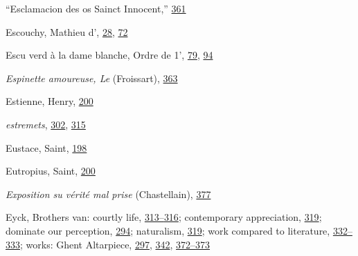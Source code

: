 ``Esclamacion des os Sainct Innocent,''
\protect\hyperlink{21_Chapter_Thirteen__IMAGE_AND_WORD.xhtmlux5cux23page_361}{361}

Escouchy, Mathieu d',
\protect\hyperlink{08_Chapter_One__THE_PASSIONATE_INTE.xhtmlux5cux23page_28}{28},
\protect\hyperlink{10_Chapter_Three__THE_HEROIC_DREAM.xhtmlux5cux23page_72}{72}

\protect\hypertarget{25_INDEX.xhtmlux5cux23page_457}{}{}Escu verd à la
dame blanche, Ordre de 1',
\protect\hyperlink{10_Chapter_Three__THE_HEROIC_DREAM.xhtmlux5cux23page_79}{79},
\protect\hyperlink{10_Chapter_Three__THE_HEROIC_DREAM.xhtmlux5cux23page_94}{94}

\emph{Espinette amoureuse, Le} (Froissart),
\protect\hyperlink{21_Chapter_Thirteen__IMAGE_AND_WORD.xhtmlux5cux23page_363}{363}

Estienne, Henry,
\protect\hyperlink{13_Chapter_Six__THE_DEPICTION_OF_TH.xhtmlux5cux23page_200}{200}

\emph{estremets},
\protect\hyperlink{20_ILLUSTRATIONS_FOLLOW_PAGE.xhtmlux5cux23page_302}{302},
\protect\hyperlink{20_ILLUSTRATIONS_FOLLOW_PAGE.xhtmlux5cux23page_315}{315}

Eustace, Saint,
\protect\hyperlink{13_Chapter_Six__THE_DEPICTION_OF_TH.xhtmlux5cux23page_198}{198}

Eutropius, Saint,
\protect\hyperlink{13_Chapter_Six__THE_DEPICTION_OF_TH.xhtmlux5cux23page_200}{200}

\emph{Exposition su vérité mal prise} (Chastellain),
\protect\hyperlink{21_Chapter_Thirteen__IMAGE_AND_WORD.xhtmlux5cux23page_377}{377}

Eyck, Brothers van: courtly life,
\protect\hyperlink{20_ILLUSTRATIONS_FOLLOW_PAGE.xhtmlux5cux23page_313}{313--}\protect\hyperlink{20_ILLUSTRATIONS_FOLLOW_PAGE.xhtmlux5cux23page_316}{316};
contemporary appreciation,
\protect\hyperlink{20_ILLUSTRATIONS_FOLLOW_PAGE.xhtmlux5cux23page_319}{319};
dominate our perception,
\protect\hyperlink{19_Chapter_Twelve__ART_IN_LIFE.xhtmlux5cux23page_294}{294};
naturalism,
\protect\hyperlink{20_ILLUSTRATIONS_FOLLOW_PAGE.xhtmlux5cux23page_319}{319};
work compared to literature,
\protect\hyperlink{21_Chapter_Thirteen__IMAGE_AND_WORD.xhtmlux5cux23page_332}{332--}\protect\hyperlink{21_Chapter_Thirteen__IMAGE_AND_WORD.xhtmlux5cux23page_333}{333};
works: Ghent Altarpiece,
\protect\hyperlink{19_Chapter_Twelve__ART_IN_LIFE.xhtmlux5cux23page_297}{297},
\protect\hyperlink{21_Chapter_Thirteen__IMAGE_AND_WORD.xhtmlux5cux23page_342}{342},
\protect\hyperlink{21_Chapter_Thirteen__IMAGE_AND_WORD.xhtmlux5cux23page_372}{372--}\protect\hyperlink{21_Chapter_Thirteen__IMAGE_AND_WORD.xhtmlux5cux23page_373}{373}

